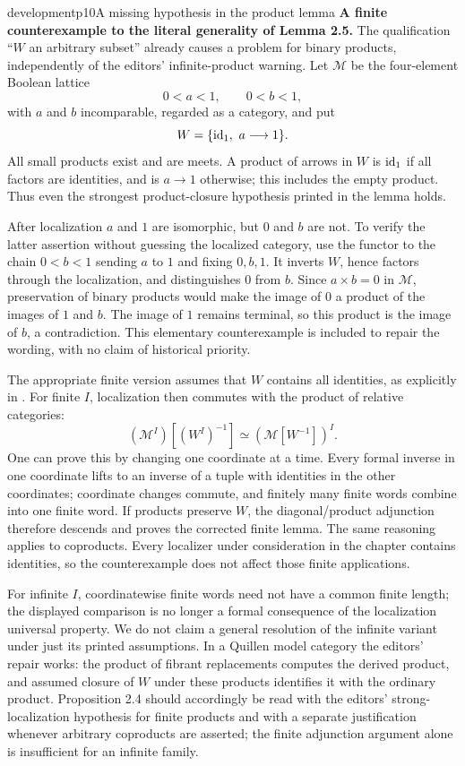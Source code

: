 \begin{dcomment}{development}{p10}{A missing hypothesis in the product lemma}
\textbf{A finite counterexample to the literal generality of Lemma 2.5.}\ours
The qualification ``$W$ an arbitrary subset'' already causes a problem for binary products, independently of the editors' infinite-product warning. Let $\mathcal M$ be the four-element Boolean lattice
\[
0<a<1,\qquad 0<b<1,
\]
with $a$ and $b$ incomparable, regarded as a category, and put
\[
W=\{\mathrm{id}_1,\ a\longrightarrow1\}.
\]
All small products exist and are meets. A product of arrows in $W$ is $\mathrm{id}_1$ if all factors are identities, and is $a\to1$ otherwise; this includes the empty product. Thus even the strongest product-closure hypothesis printed in the lemma holds.

After localization $a$ and $1$ are isomorphic, but $0$ and $b$ are not. To verify the latter assertion without guessing the localized category, use the functor to the chain $0<b<1$ sending $a$ to $1$ and fixing $0,b,1$. It inverts $W$, hence factors through the localization, and distinguishes $0$ from $b$. Since $a\times b=0$ in $\mathcal M$, preservation of binary products would make the image of $0$ a product of the images of $1$ and $b$. The image of $1$ remains terminal, so this product is the image of $b$, a contradiction. This elementary counterexample is included to repair the wording, with no claim of historical priority.

The appropriate finite version assumes that $W$ contains all identities, as explicitly in \citet[Lemma 2.1.7 and Proposition 2.1.8, pp.~114--115]{Maltsiniotis2020}. For finite $I$, localization then commutes with the product of relative categories:
\[
(\mathcal M^I)[(W^I)^{-1}]
 \simeq (\mathcal M[W^{-1}])^I.
\]
One can prove this by changing one coordinate at a time. Every formal inverse in one coordinate lifts to an inverse of a tuple with identities in the other coordinates; coordinate changes commute, and finitely many finite words combine into one finite word. If products preserve $W$, the diagonal/product adjunction therefore descends and proves the corrected finite lemma. The same reasoning applies to coproducts. Every localizer under consideration in the chapter contains identities, so the counterexample does not affect those finite applications.

For infinite $I$, coordinatewise finite words need not have a common finite length; the displayed comparison is no longer a formal consequence of the localization universal property. We do not claim a general resolution of the infinite variant under just its printed assumptions. In a Quillen model category the editors' repair works: the product of fibrant replacements computes the derived product, and assumed closure of $W$ under these products identifies it with the ordinary product. Proposition 2.4 should accordingly be read with the editors' strong-localization hypothesis for finite products and with a separate justification whenever arbitrary coproducts are asserted; the finite adjunction argument alone is insufficient for an infinite family.
\end{dcomment}


